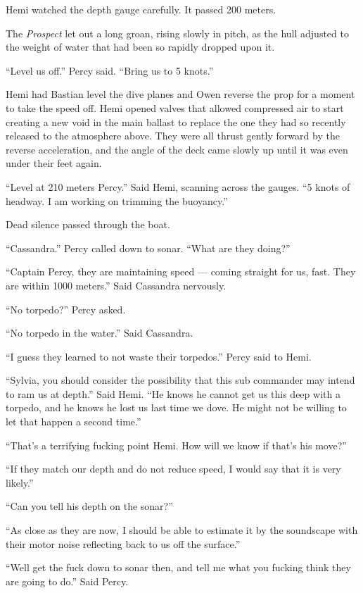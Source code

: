 \documentclass[]{scrbook}
\begin{document}
Hemi watched the depth gauge carefully. It passed 200 meters.

The \emph{Prospect} let out a long groan, rising slowly in pitch, as the
hull adjusted to the weight of water that had been so rapidly dropped
upon it.

``Level us off.'' Percy said. ``Bring us to 5 knots.''

Hemi had Bastian level the dive planes and Owen reverse the prop for a
moment to take the speed off. Hemi opened valves that allowed compressed
air to start creating a new void in the main ballast to replace the one
they had so recently released to the atmosphere above. They were all
thrust gently forward by the reverse acceleration, and the angle of the
deck came slowly up until it was even under their feet again.

``Level at 210 meters Percy.'' Said Hemi, scanning across the gauges.
``5 knots of headway. I am working on trimming the buoyancy.''

Dead silence passed through the boat.

``Cassandra.'' Percy called down to sonar. ``What are they doing?''

``Captain Percy, they are maintaining speed --- coming straight for us,
fast. They are within 1000 meters.'' Said Cassandra nervously.

``No torpedo?'' Percy asked.

``No torpedo in the water.'' Said Cassandra.

``I guess they learned to not waste their torpedos.'' Percy said to
Hemi.

``Sylvia, you should consider the possibility that this sub commander
may intend to ram us at depth.'' Said Hemi. ``He knows he cannot get us
this deep with a torpedo, and he knows he lost us last time we dove. He
might not be willing to let that happen a second time.''

``That's a terrifying fucking point Hemi. How will we know if that's his
move?''

``If they match our depth and do not reduce speed, I would say that it
is very likely.''

``Can you tell his depth on the sonar?''

``As close as they are now, I should be able to estimate it by the
soundscape with their motor noise reflecting back to us off the
surface.''

``Well get the fuck down to sonar then, and tell me what you fucking
think they are going to do.'' Said Percy.
\end{document}
